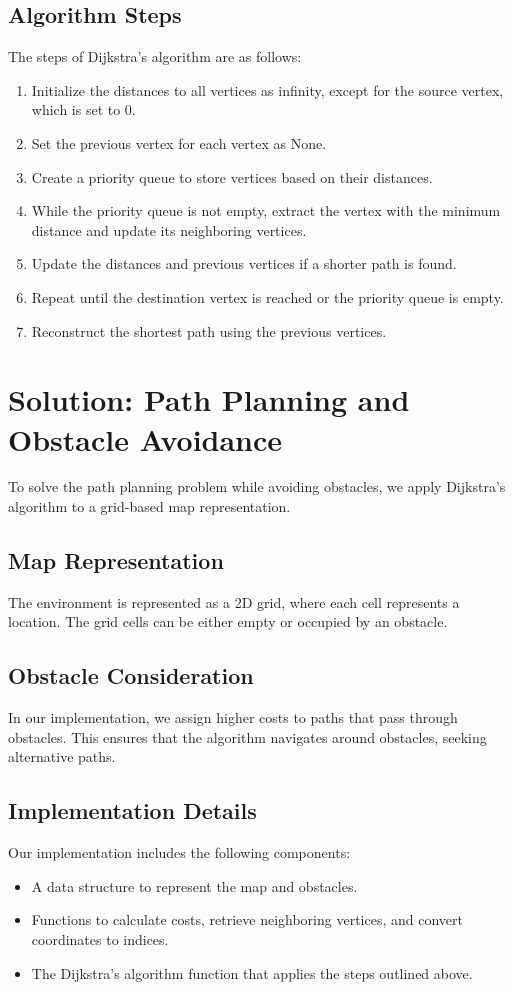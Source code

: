 \documentclass{article}
\begin{document}
\subsection{Algorithm Steps}
The steps of Dijkstra's algorithm are as follows:

\begin{enumerate}
  \item Initialize the distances to all vertices as infinity, except for the source vertex, which is set to 0.
  \item Set the previous vertex for each vertex as None.
  \item Create a priority queue to store vertices based on their distances.
  \item While the priority queue is not empty, extract the vertex with the minimum distance and update its neighboring vertices.
  \item Update the distances and previous vertices if a shorter path is found.
  \item Repeat until the destination vertex is reached or the priority queue is empty.
  \item Reconstruct the shortest path using the previous vertices.
\end{enumerate}

\section{Solution: Path Planning and Obstacle Avoidance}
To solve the path planning problem while avoiding obstacles, we apply Dijkstra's algorithm to a grid-based map representation.

\subsection{Map Representation}
The environment is represented as a 2D grid, where each cell represents a location. The grid cells can be either empty or occupied by an obstacle.

\subsection{Obstacle Consideration}
In our implementation, we assign higher costs to paths that pass through obstacles. This ensures that the algorithm navigates around obstacles, seeking alternative paths.

\subsection{Implementation Details}
Our implementation includes the following components:
\begin{itemize}
  \item A data structure to represent the map and obstacles.
  \item Functions to calculate costs, retrieve neighboring vertices, and convert coordinates to indices.
  \item The Dijkstra's algorithm function that applies the steps outlined above.
\end{itemize}
\end{document}
